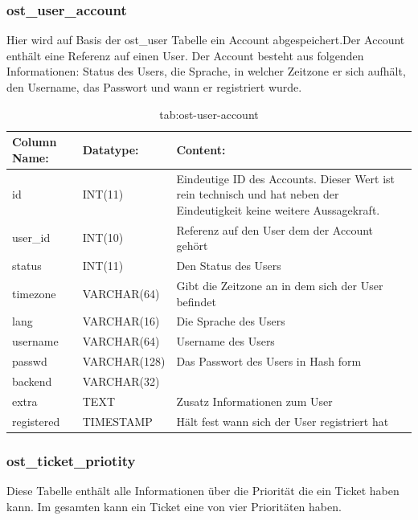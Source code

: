 \subsubsection{ost\_user\_account}

Hier wird auf Basis der ost\_user Tabelle ein Account abgespeichert.Der Account enthält eine Referenz auf einen User. Der Account besteht aus folgenden Informationen: Status des Users, die Sprache, in welcher Zeitzone er sich aufhält, den Username, das Passwort und wann er registriert wurde.

\begin{table}[h]
	\begin{tabular}{|p{3cm}|p{4cm}|p{7.7cm}|}
		\hline
		\textbf{Column Name:} & \textbf{Datatype:} & \textbf{Content:}\\
		\hline
		id & INT(11) & Eindeutige ID des Accounts. Dieser Wert ist rein technisch und hat  neben der Eindeutigkeit keine weitere 
		Aussagekraft.\\
		\hline
		user\_id & INT(10) & Referenz auf den User dem der Account gehört\\
		\hline
		status& INT(11) & Den Status des Users \\
		\hline
		timezone & VARCHAR(64) & Gibt die Zeitzone an in dem sich der User befindet\\
		\hline
		lang & VARCHAR(16) & Die Sprache des Users\\
		\hline
		username & VARCHAR(64) & Username des Users\\
		\hline
		passwd & VARCHAR(128) & Das Passwort des Users in Hash form\\
		\hline
		backend & VARCHAR(32) &\\
		\hline
		extra & TEXT & Zusatz Informationen zum User\\
		\hline
		registered & TIMESTAMP & Hält fest wann sich der User registriert hat\\
		\hline
		
	\end{tabular}
	\caption{tab:ost-user-account}
\end{table}
\label{tab:ost_user_account}

\newpage

\subsubsection{ost\_ticket\_priotity}

Diese Tabelle enthält alle Informationen über die Priorität die ein Ticket haben kann.
Im gesamten kann ein Ticket eine von vier Prioritäten haben.

